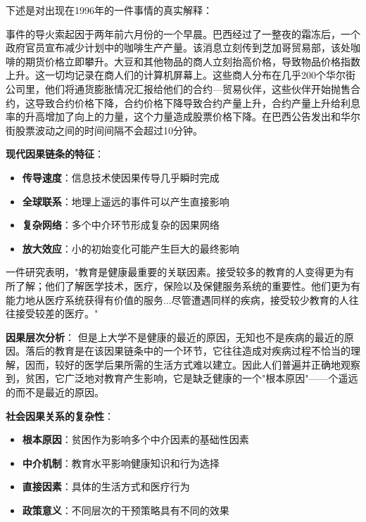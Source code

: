 \begin{examplebox}[title=全球经济中的快速因果传导]
下述是对出现在1996年的一件事情的真实解释：

事件的导火索起因于两年前六月份的一个早晨。巴西经过了一整夜的霜冻后，一个政府官员宣布减少计划中的咖啡生产产量。该消息立刻传到芝加哥贸易部，该处咖啡的期货价格立即攀升。大豆和其他物品的商人立刻抬高价格，导致物品价格指数上升。这一切均记录在商人们的计算机屏幕上。这些商人分布在几乎200个华尔街公司里，他们将通货膨胀情况汇报给他们的合约—贸易伙伴，这些伙伴开始抛售合约，这导致合约价格下降，合约价格下降导致合约产量上升，合约产量上升给利息率的升高增加了向上的力量，这个力量造成股票价格下降。在巴西公告发出和华尔街股票波动之间的时间间隔不会超过10分钟。\cite{nasar1996}

\textbf{现代因果链条的特征}：
\begin{itemize}
\item \textbf{传导速度}：信息技术使因果传导几乎瞬时完成
\item \textbf{全球联系}：地理上遥远的事件可以产生直接影响
\item \textbf{复杂网络}：多个中介环节形成复杂的因果网络
\item \textbf{放大效应}：小的初始变化可能产生巨大的最终影响
\end{itemize}
\end{examplebox}

\begin{examplebox}[title=教育与健康的多层次因果关系]
一件研究表明，"教育是健康最重要的关联因素。接受较多的教育的人变得更为有所了解；他们了解医学技术，医疗，保险以及保健服务系统的重要性。他们更为有能力地从医疗系统获得有价值的服务...尽管遭遇同样的疾病，接受较少教育的人往往接受较差的医疗。"\cite{kitagawa1973}

\textbf{因果层次分析}：
但是上大学不是健康的最近的原因，无知也不是疾病的最近的原因。落后的教育是在该因果链条中的一个环节，它往往造成对疾病过程不恰当的理解，因而，较好的医学后果所需的生活方式难以建立。因此人们普遍并正确地观察到，贫困，它广泛地对教育产生影响，它是缺乏健康的一个"根本原因"——个遥远的而不是最近的原因。

\textbf{社会因果关系的复杂性}：
\begin{itemize}
\item \textbf{根本原因}：贫困作为影响多个中介因素的基础性因素
\item \textbf{中介机制}：教育水平影响健康知识和行为选择
\item \textbf{直接因素}：具体的生活方式和医疗行为
\item \textbf{政策意义}：不同层次的干预策略具有不同的效果
\end{itemize}
\end{examplebox}

